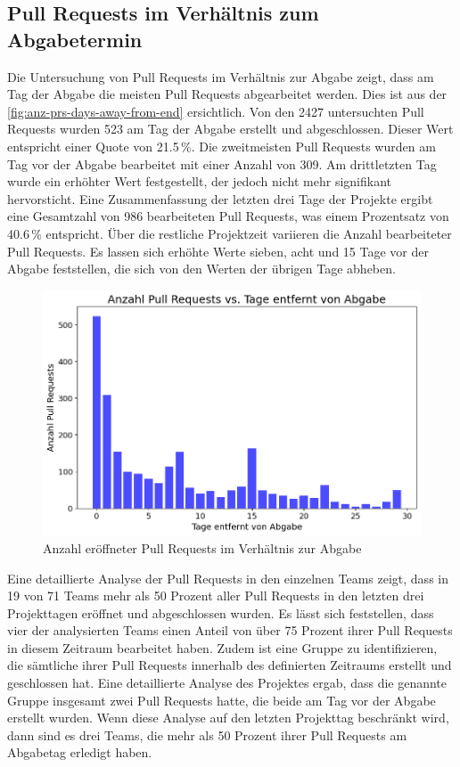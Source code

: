 \subsection{Pull Requests im Verhältnis zum Abgabetermin}
Die Untersuchung von Pull Requests im Verhältnis zur Abgabe zeigt, dass am Tag der Abgabe die meisten Pull Requests abgearbeitet werden. Dies ist aus der \autoref{fig:anz-prs-days-away-from-end} ersichtlich. Von den 2427 untersuchten Pull Requests wurden 523 am Tag der Abgabe erstellt und abgeschlossen. Dieser Wert entspricht einer Quote von 21.5\,\%.  Die zweitmeisten Pull Requests wurden am Tag vor der Abgabe bearbeitet mit einer Anzahl von 309. Am drittletzten Tag wurde ein erhöhter Wert festgestellt, der jedoch nicht mehr signifikant hervorsticht. Eine Zusammenfassung der letzten drei Tage der Projekte ergibt eine Gesamtzahl von 986 bearbeiteten Pull Requests, was einem Prozentsatz von 40.6\,\% entspricht. Über die restliche Projektzeit variieren die Anzahl bearbeiteter Pull Requests. Es lassen sich erhöhte Werte sieben, acht und 15 Tage vor der Abgabe feststellen, die sich von den Werten der übrigen Tage abheben.
\begin{figure}[htbp]
    \includegraphics[width=\textwidth]{Figures/anz-prs-days-away-from-end.png}
    \caption{Anzahl eröffneter Pull Requests im Verhältnis zur Abgabe}
    \label{fig:anz-prs-days-away-from-end}
\end{figure}
\newpage
Eine detaillierte Analyse der Pull Requests in den einzelnen Teams zeigt, dass in 19 von 71 Teams mehr als 50 Prozent aller Pull Requests in den letzten drei Projekttagen eröffnet und abgeschlossen wurden. Es lässt sich feststellen, dass vier der analysierten Teams einen Anteil von über 75 Prozent ihrer Pull Requests in diesem Zeitraum bearbeitet haben. Zudem ist eine Gruppe zu identifizieren, die sämtliche ihrer Pull Requests innerhalb des definierten Zeitraums erstellt und geschlossen hat. Eine detaillierte Analyse des Projektes ergab, dass die genannte Gruppe insgesamt zwei Pull Requests hatte, die beide am Tag vor der Abgabe erstellt wurden. Wenn diese Analyse auf den letzten Projekttag beschränkt wird, dann sind es drei Teams, die mehr als 50 Prozent ihrer Pull Requests am Abgabetag erledigt haben.


